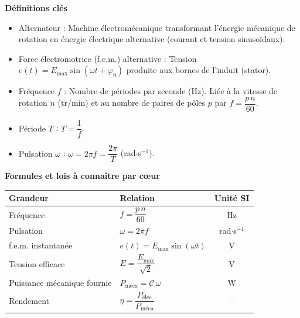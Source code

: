 \documentclass[11pt]{article}
\newcommand{\cle}[1]{{\popxbold\color{popdark}#1}}
\begin{document}
\begin{bilan}

\textbf{Définitions clés}
\begin{itemize}
    \item \cle{Alternateur} : Machine électromécanique transformant l'énergie mécanique de rotation en énergie électrique alternative (courant et tension sinusoïdaux).
    \item \cle{Force électromotrice (f.e.m.) alternative} : Tension $e(t) = E_{\max} \sin(\omega t + \varphi_0)$ produite aux bornes de l'induit (stator).
    \item \cle{Fréquence $f$} : Nombre de périodes par seconde (Hz). Liée à la vitesse de rotation $n$ (tr/min) et au nombre de paires de pôles $p$ par $f = \dfrac{p\, n}{60}$.
    \item \cle{Période $T$} : $T = \dfrac{1}{f}$.
    \item \cle{Pulsation $\omega$} : $\omega = 2\pi f = \dfrac{2\pi}{T}$ (rad$\cdot$s$^{-1}$).
\end{itemize}

\textbf{Formules et lois à connaître par cœur}
\begin{center}
\begin{tabularx}{\linewidth}{|l|X|c|}\hline
\textbf{Grandeur} & \textbf{Relation} & \textbf{Unité SI} \\ \hline
Fréquence & $f = \dfrac{p\, n}{60}$ & Hz \\ \hline
Pulsation & $\omega = 2\pi f$ & rad$\cdot$s$^{-1}$ \\ \hline
f.e.m. instantanée & $e(t) = E_{\max} \sin(\omega t)$ & V \\ \hline
Tension efficace & $E = \dfrac{E_{\max}}{\sqrt{2}}$ & V \\ \hline
Puissance mécanique fournie & $P_{\text{méca}} = \mathcal{C}\, \omega$ & W \\ \hline
Rendement & $\eta = \dfrac{P_{\text{élec}}}{P_{\text{méca}}}$ & -- \\ \hline
\end{tabularx}
\end{center}


\end{bilan}
\end{document}
